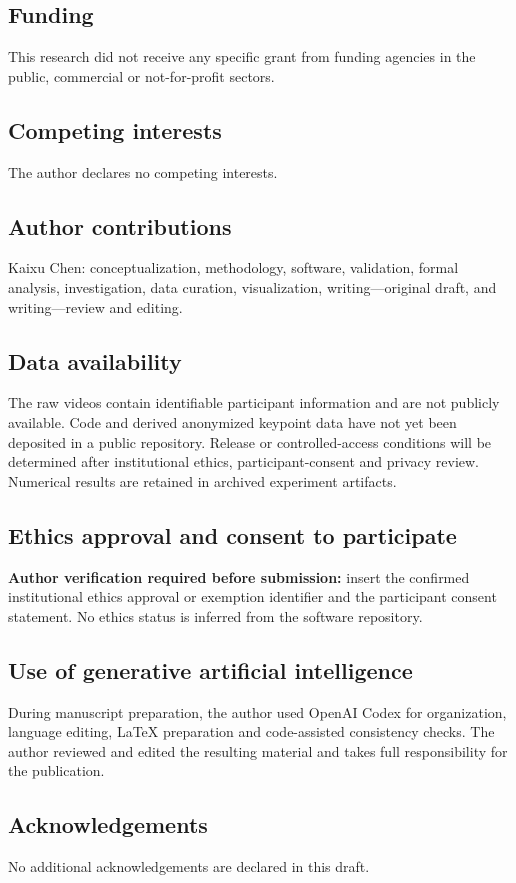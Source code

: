 \documentclass[lineno,pdflatex,sn-mathphys-num]{sn-jnl}
\begin{document}
\subsection*{Funding}
This research did not receive any specific grant from funding agencies in the
public, commercial or not-for-profit sectors.

\subsection*{Competing interests}
The author declares no competing interests.

\subsection*{Author contributions}
Kaixu Chen: conceptualization, methodology, software, validation, formal
analysis, investigation, data curation, visualization, writing---original
draft, and writing---review and editing.

\subsection*{Data availability}
The raw videos contain identifiable participant information and are not
publicly available. Code and derived anonymized keypoint data have not yet been
deposited in a public repository. Release or controlled-access conditions will
be determined after institutional ethics, participant-consent and privacy
review. Numerical results are retained in archived experiment artifacts.

\subsection*{Ethics approval and consent to participate}
\textbf{Author verification required before submission:} insert the confirmed
institutional ethics approval or exemption identifier and the participant
consent statement. No ethics status is inferred from the software repository.

\subsection*{Use of generative artificial intelligence}
During manuscript preparation, the author used OpenAI Codex for organization,
language editing, LaTeX preparation and code-assisted consistency checks. The
author reviewed and edited the resulting material and takes full responsibility
for the publication.

\subsection*{Acknowledgements}
No additional acknowledgements are declared in this draft.
\end{document}
